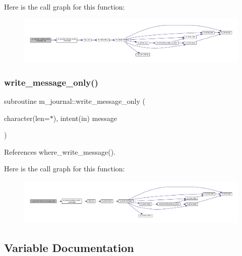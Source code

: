 Here is the call graph for this function\+:\nopagebreak
\begin{figure}[H]
\begin{center}
\leavevmode
\includegraphics[width=350pt]{namespacem__journal_a25d0f5da7f7e84e22ab0a583447412b1_cgraph}
\end{center}
\end{figure}
\mbox{\label{namespacem__journal_aa86511a7c388f9286c282f6fa933ab58}} 
\subsubsection{\texorpdfstring{write\+\_\+message\+\_\+only()}{write\_message\_only()}}
{\footnotesize\ttfamily subroutine m\+\_\+journal\+::write\+\_\+message\+\_\+only (\begin{DoxyParamCaption}\item[{character(len=$\ast$), intent(in)}]{message }\end{DoxyParamCaption})\hspace{0.3cm}{\ttfamily [private]}}



References where\+\_\+write\+\_\+message().

Here is the call graph for this function\+:\nopagebreak
\begin{figure}[H]
\begin{center}
\leavevmode
\includegraphics[width=350pt]{namespacem__journal_aa86511a7c388f9286c282f6fa933ab58_cgraph}
\end{center}
\end{figure}


\subsection{Variable Documentation}
\mbox{\label{namespacem__journal_a6184fbcebdfa06f0a45ce4c699189b53}} 
